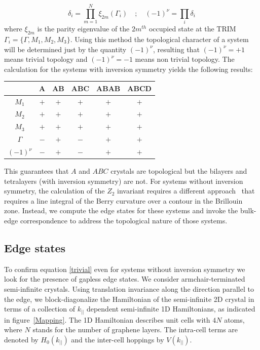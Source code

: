 \begin{equation}
\delta_{i} = \displaystyle\prod^{N}_{m=1}\xi_{2m}(\Gamma_{i}) \quad;\quad (-1)^{\nu} = \prod_{i}\delta_{i}
\end{equation}
where $\xi_{2m}$ is the parity eigenvalue of the $2m^{th}$ occupied state at the TRIM $\Gamma_{i}=\{\Gamma,M_{1},M_{2},M_{3}\}$. Using this method the topological character of a system will be determined just by the quantity $(-1)^{\nu}$, resulting that $(-1)^{\nu}=+1$ means trivial topology and $(-1)^{\nu}=-1$ means non trivial topology.
The calculation for the systems with inversion symmetry yields the following results:
\begin{center}
 \begin{tabular}{ c | c c c c c}
              &  A  &  AB & ABC & ABAB & ABCD \\\hline
     $M_{1}$  & $+$ & $+$ & $+$ &  $+$ &  $+$  \\
     $M_{2}$  & $+$ & $+$ & $+$ &  $+$ &  $+$  \\
     $M_{3}$  & $+$ & $+$ & $+$ &  $+$ &  $+$  \\
     $\Gamma$ & $-$ & $+$ & $-$ &  $+$ &  $+$  \\\hline
 $(-1)^{\nu}$ & $-$ & $+$ & $-$ &  $+$ &  $+$
 \end{tabular}
\label{parity}
\end{center}

This guarantees that $A$ and $ABC$  crystals are topological but the bilayers and tetralayers (with inversion symmetry) are not.
For systems without inversion symmetry, the calculation of the $Z_{2}$ invariant requires a different approach~\cite{Fu2006, Fukui2005, Fukui2007} that requires a line integral of the Berry curvature over a contour in the Brillouin zone. Instead, we compute the edge states for these systems and invoke the bulk-edge correspondence to address the topological nature of those systems.


\subsection{Edge states}
To confirm equation \eqref{trivial} even for systems without inversion symmetry we look for the presence of gapless edge states.
We consider armchair-terminated  semi-infinite crystals.  Using translation invariance along the direction parallel to the edge, we block-diagonalize  the Hamiltonian of the semi-infinite 2D  crystal in terms of a collection of $k_{||}$ dependent semi-infinite 1D Hamiltonians, as indicated in figure~\ref{Mapping}. The 1D Hamiltonian describes unit cells with $4N$ atoms, where $N$ stands for the number of graphene layers.  The intra-cell terms are denoted by $H_0(k_{||})$ and the inter-cell hoppings by $V(k_{||})$.




